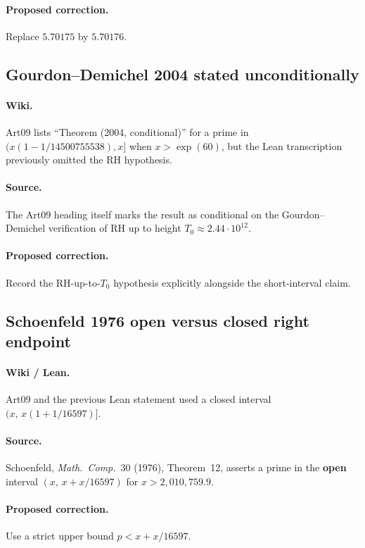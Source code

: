\documentclass[11pt,a4paper]{article}
\begin{document}
\paragraph{Proposed correction.}
Replace $5.70175$ by $5.70176$.

\subsection{Gourdon--Demichel 2004 stated unconditionally}
\label{err:gourdon-conditional}
\paragraph{Wiki.}
Art09 lists ``Theorem (2004, conditional)'' for a prime in
$(x(1-1/14500755538),x]$ when $x>\exp(60)$, but the Lean transcription
previously omitted the RH hypothesis.
\paragraph{Source.}
The Art09 heading itself marks the result as conditional on the
Gourdon--Demichel verification of RH up to height
$T_0\approx 2.44\cdot 10^{12}$.
\paragraph{Proposed correction.}
Record the RH-up-to-$T_0$ hypothesis explicitly alongside the short-interval
claim.

\subsection{Schoenfeld 1976 open versus closed right endpoint}
\label{err:schoenfeld-open}
\paragraph{Wiki / Lean.}
Art09 and the previous Lean statement used a closed interval
$(x,\,x(1+1/16597)]$.
\paragraph{Source.}
Schoenfeld, \emph{Math.\ Comp.}\ 30 (1976), Theorem~12, asserts a prime in
the \textbf{open} interval $(x,\,x+x/16597)$ for $x>2{,}010{,}759.9$.
\paragraph{Proposed correction.}
Use a strict upper bound $p<x+x/16597$.
\end{document}
